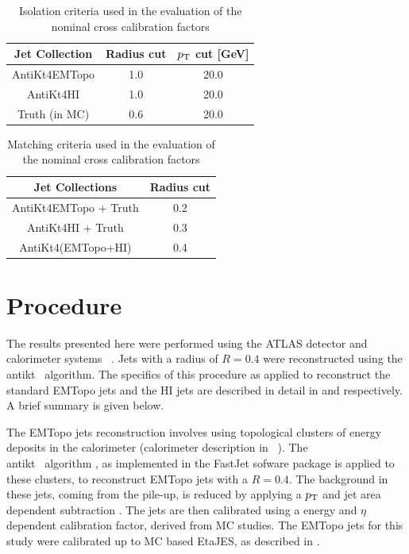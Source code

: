 \begin{table}[ht]
\caption{Isolation criteria used in the evaluation of the nominal cross calibration factors}
\centering
\begin{tabular}{c c c}
\hline\hline
Jet Collection & Radius cut & $\mbox{$p_{\mathrm{T}}$}$ cut [GeV] \\ [0.5ex] %
\hline
AntiKt4EMTopo & 1.0 & 20.0 \\ 
AntiKt4HI & 1.0 & 20.0 \\ 
Truth (in MC) & 0.6 & 20.0 \\ 
\hline
\end{tabular}
\label{table:iso_criteria}
\end{table}

\begin{table}[ht]
\caption{Matching criteria used in the evaluation of the nominal cross calibration factors}
\centering
\begin{tabular}{c c}
\hline\hline
Jet Collections & Radius cut \\ [0.5ex] %
\hline
AntiKt4EMTopo + Truth & 0.2 \\ 
AntiKt4HI + Truth & 0.3 \\ 
AntiKt4(EMTopo+HI) & 0.4\\ 
\hline
\end{tabular}
\label{table:match_criteria}
\end{table}


\section{Procedure}
\label{sec:qual_procedure}

The results presented here were performed using the ATLAS detector and calorimeter systems ~\cite{Aad:2008zzm}. Jets with a radius of $R=0.4$ were reconstructed using the \\antikt \ algorithm.  The specifics of this procedure as applied to reconstruct the standard EMTopo jets and the HI jets are described in detail in \cite{Aad:2011he} and \cite{Aad:hi_jets} respectively. A brief summary is given below.

The EMTopo jets reconstruction involves using topological clusters of energy deposits in the calorimeter (calorimeter description in ~\cite{Aad:2008zzm}). The \\antikt \ algorithm \cite{Cacciari:2008gp}, as implemented in the FastJet sofware package \cite{fastjet_algo} is applied to these clusters, to reconstruct EMTopo jets with a $R = 0.4$.  The background in these jets, coming from the pile-up, is reduced by applying a $\mbox{$p_{\mathrm{T}}$}$ and jet area dependent subtraction \cite{pp_pileup_subtr}. The jets are then calibrated using a energy and $\eta$ dependent calibration factor, derived from MC studies. The EMTopo jets for this study were calibrated up to MC based EtaJES, as described in \cite{CalibReco}.

